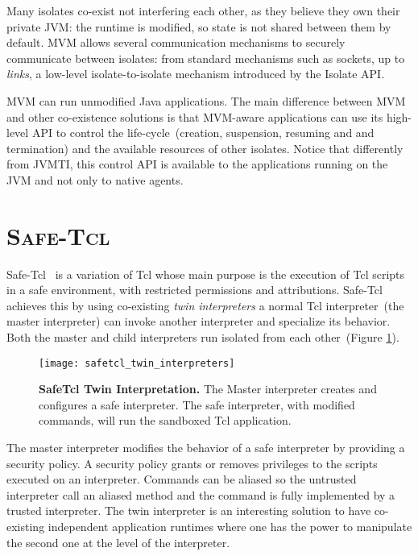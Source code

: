Many isolates co-exist not interfering each other, as they believe they own their private JVM: the runtime is modified, so state is not shared between them by default. MVM allows several communication mechanisms to securely communicate between isolates: from standard mechanisms such as sockets, up to \emph{links}, a low-level isolate-to-isolate mechanism introduced by the Isolate API.

MVM can run unmodified Java applications. The main difference between MVM and other co-existence solutions is that MVM-aware applications can use its high-level API to control the life-cycle~(\eg creation, suspension, resuming and and termination) and the available resources of other isolates. Notice that differently from JVMTI, this control API is available to the applications running on the JVM and not only to native agents.

\section*{\textsc{Safe-Tcl}}
Safe-Tcl~\cite{Levy97a, Bore94a} is a variation of Tcl whose main purpose is the execution of Tcl scripts in a safe environment, with restricted permissions and attributions. Safe-Tcl achieves this by using co-existing \emph{twin interpreters} \ie a normal Tcl interpreter~(the master interpreter) can invoke another interpreter and specialize its behavior. Both the master and child interpreters run isolated from each other~(Figure \ref{fig:safetcl_twin_interpreters}).

\begin{figure}[ht]
\begin{center}
\texttt{[image: safetcl\_twin\_interpreters]}
\caption{\textbf{SafeTcl Twin Interpretation.} The Master interpreter creates and configures a safe interpreter. The safe interpreter, with modified commands, will run the sandboxed Tcl application.\label{fig:safetcl_twin_interpreters}
 }
\end{center}
\end{figure}

The master interpreter modifies the behavior of a safe interpreter by providing a security policy. A security policy grants or removes privileges to the scripts executed on an interpreter. Commands can be aliased so the untrusted interpreter call an aliased method and the command is fully implemented by a trusted interpreter. The twin interpreter is an interesting solution to have co-existing independent application runtimes where one has the power to manipulate the second one at the level of the interpreter.

